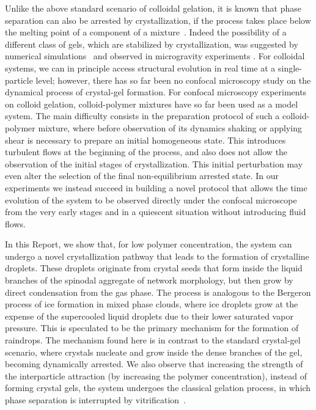 \documentclass[12pt]{article}
\begin{document}
Unlike the above standard scenario of colloidal gelation, it is known that phase separation can also be arrested by crystallization, if the process takes place below the melting point of a component of a mixture~\cite{tanaka1985new}. Indeed the possibility of a different class of gels, which are stabilized by crystallization, 
was suggested by numerical simulations~\cite{fortini2008crystallization,perez2011pathways} and observed in microgravity experiments \cite{sabin2012}. 
For colloidal systems, we can in principle access structural evolution in real time at a single-particle level; however, there has so far been no confocal microscopy  
study on the dynamical process of crystal-gel formation. 
For confocal microscopy experiments on colloid gelation, colloid-polymer mixtures have so far been used as a model system. 
The main difficulty consists in the preparation protocol of such a colloid-polymer mixture, where before observation of its dynamics shaking or applying shear is necessary to prepare an initial homogeneous state. This introduces turbulent flows at the beginning of the process, and also does not allow the
observation of the initial stages of crystallization. This initial perturbation may even alter the selection of the final non-equilibrium arrested state.  
In our experiments we instead succeed in building a novel protocol that allows the time evolution of the system to be observed directly
under the confocal microscope from the very early stages and in a quiescent situation without introducing fluid flows. 

In this Report, we show that, for low polymer concentration, the system can undergo a novel crystallization pathway that leads to the formation
of crystalline droplets. These droplets originate from crystal seeds that form inside the liquid branches of the spinodal aggregate of network morphology, but then grow by direct condensation from the gas phase. The process is analogous to the Bergeron process of ice formation in mixed phase clouds, where ice droplets grow at the
expense of the supercooled liquid droplets due to their lower saturated vapor pressure. 
This is speculated to be the primary mechanism for the formation of raindrops. 
The mechanism found here is in contrast to the standard crystal-gel scenario, where crystals nucleate and grow inside the dense branches of the gel, becoming dynamically arrested. We also observe that increasing the strength of the interparticle attraction
(by increasing the polymer concentration), instead of forming crystal gels, the system undergoes the classical gelation process, in which
phase separation is interrupted by vitrification~\cite{verhaegh1997transient,tanaka1999colloid,Royall2007,lu2008gelation}. 
\end{document}
